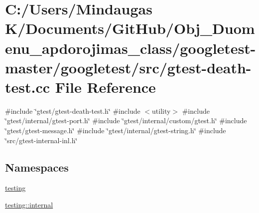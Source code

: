 \hypertarget{googletest-master_2googletest_2src_2gtest-death-test_8cc}{}\section{C\+:/\+Users/\+Mindaugas K/\+Documents/\+Git\+Hub/\+Obj\+\_\+\+Duomenu\+\_\+apdorojimas\+\_\+class/googletest-\/master/googletest/src/gtest-\/death-\/test.cc File Reference}
\label{googletest-master_2googletest_2src_2gtest-death-test_8cc}
{\ttfamily \#include \char`\"{}gtest/gtest-\/death-\/test.\+h\char`\"{}}\newline
{\ttfamily \#include $<$utility$>$}\newline
{\ttfamily \#include \char`\"{}gtest/internal/gtest-\/port.\+h\char`\"{}}\newline
{\ttfamily \#include \char`\"{}gtest/internal/custom/gtest.\+h\char`\"{}}\newline
{\ttfamily \#include \char`\"{}gtest/gtest-\/message.\+h\char`\"{}}\newline
{\ttfamily \#include \char`\"{}gtest/internal/gtest-\/string.\+h\char`\"{}}\newline
{\ttfamily \#include \char`\"{}src/gtest-\/internal-\/inl.\+h\char`\"{}}\newline
\subsection*{Namespaces}
\begin{DoxyCompactItemize}
\item 
 \mbox{\hyperlink{namespacetesting}{testing}}
\item 
 \mbox{\hyperlink{namespacetesting_1_1internal}{testing\+::internal}}
\end{DoxyCompactItemize}

